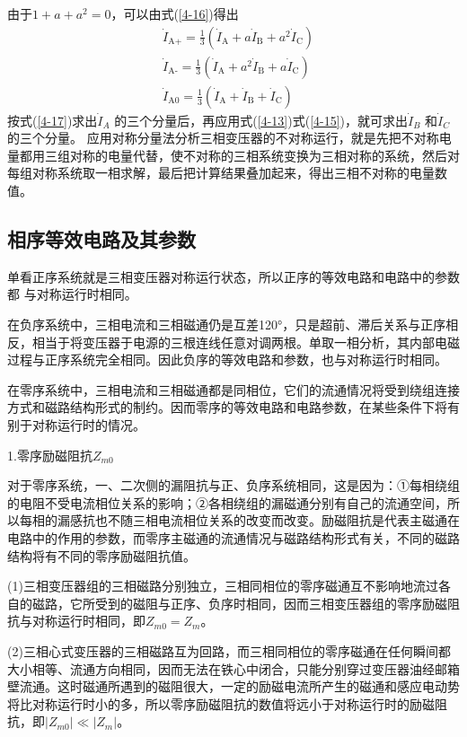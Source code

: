 \documentclass{book}
\begin{document}
由于$1+a+{{a}^{2}}=0$，可以由式(\ref{4-16})得出
\begin{align}
& {{{\dot{I}}}_{\text{A+}}}=\frac{1}{3}\left( {{{\dot{I}}}_{\text{A}}}+a{{{\dot{I}}}_{\text{B}}}+{{a}^{2}}{{{\dot{I}}}_{\text{C}}} \right) \\ 
& {{{\dot{I}}}_{\text{A-}}}=\frac{1}{3}\left( {{{\dot{I}}}_{\text{A}}}+{{a}^{2}}{{{\dot{I}}}_{\text{B}}}+a{{{\dot{I}}}_{\text{C}}} \right) \\ 
& {{{\dot{I}}}_{\text{A0}}}=\frac{1}{3}\left( {{{\dot{I}}}_{\text{A}}}+{{{\dot{I}}}_{\text{B}}}+{{{\dot{I}}}_{\text{C}}} \right)
\label{4-17}
\end{align}
按式(\ref{4-17})求出${{\dot{I}}_{A}}$ 的三个分量后，再应用式(\ref{4-13})式(\ref{4-15})，就可求出${{\dot{I}}_{B}}$ 和${{\dot{I}}_{C}}$ 的三个分量。
应用对称分量法分析三相变压器的不对称运行，就是先把不对称电量都用三组对称的电量代替，使不对称的三相系统变换为三相对称的系统，然后对每组对称系统取一相求解，最后把计算结果叠加起来，得出三相不对称的电量数值。

\subsection{相序等效电路及其参数}
单看正序系统就是三相变压器对称运行状态，所以正序的等效电路和电路中的参数都 与对称运行时相同。

在负序系统中，三相电流和三相磁通仍是互差120°，只是超前、滞后关系与正序相反，相当于将变压器于电源的三根连线任意对调两根。单取一相分析，其内部电磁过程与正序系统完全相同。因此负序的等效电路和参数，也与对称运行时相同。

在零序系统中，三相电流和三相磁通都是同相位，它们的流通情况将受到绕组连接方式和磁路结构形式的制约。因而零序的等效电路和电路参数，在某些条件下将有别于对称运行时的情况。

1.零序励磁阻抗${{Z}_{m0}}$ 

对于零序系统，一、二次侧的漏阻抗与正、负序系统相同，这是因为：①每相绕组的电阻不受电流相位关系的影响；②各相绕组的漏磁通分别有自己的流通空间，所以每相的漏感抗也不随三相电流相位关系的改变而改变。励磁阻抗是代表主磁通在电路中的作用的参数，而零序主磁通的流通情况与磁路结构形式有关，不同的磁路结构将有不同的零序励磁阻抗值。

(1)三相变压器组的三相磁路分别独立，三相同相位的零序磁通互不影响地流过各自的磁路，它所受到的磁阻与正序、负序时相同，因而三相变压器组的零序励磁阻抗与对称运行时相同，即${{Z}_{m0}}={{Z}_{m}}$。

(2)三相心式变压器的三相磁路互为回路，而三相同相位的零序磁通在任何瞬间都大小相等、流通方向相同，因而无法在铁心中闭合，只能分别穿过变压器油经邮箱壁流通。这时磁通所遇到的磁阻很大，一定的励磁电流所产生的磁通和感应电动势将比对称运行时小的多，所以零序励磁阻抗的数值将远小于对称运行时的励磁阻抗，即$\left| {{Z}_{m0}} \right|\ll \left| {{Z}_{m}} \right|$。
\end{document}
